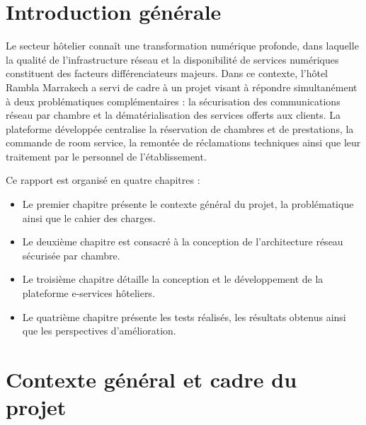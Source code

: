 \documentclass[12pt,a4paper]{report}
\begin{document}
\setcounter{page}{1}


\chapter*{Introduction générale}

Le secteur hôtelier connaît une transformation numérique profonde, dans
laquelle la qualité de l'infrastructure réseau et la disponibilité de
services numériques constituent des facteurs différenciateurs majeurs. Dans
ce contexte, l'hôtel Rambla Marrakech a servi de cadre à un projet visant
à répondre simultanément à deux problématiques complémentaires : la
sécurisation des communications réseau par chambre et la dématérialisation
des services offerts aux clients. La plateforme développée centralise la
réservation de chambres et de prestations, la commande de room service, la
remontée de réclamations techniques ainsi que leur traitement par le
personnel de l'établissement.

Ce rapport est organisé en quatre chapitres :

\begin{itemize}
    \item Le premier chapitre présente le contexte général du projet, la
    problématique ainsi que le cahier des charges.

    \item Le deuxième chapitre est consacré à la conception de l'architecture
    réseau sécurisée par chambre.

    \item Le troisième chapitre détaille la conception et le développement de
    la plateforme e-services hôteliers.

    \item Le quatrième chapitre présente les tests réalisés, les résultats
    obtenus ainsi que les perspectives d'amélioration.
\end{itemize}

\clearpage


\chapter{Contexte général et cadre du projet}
\end{document}
